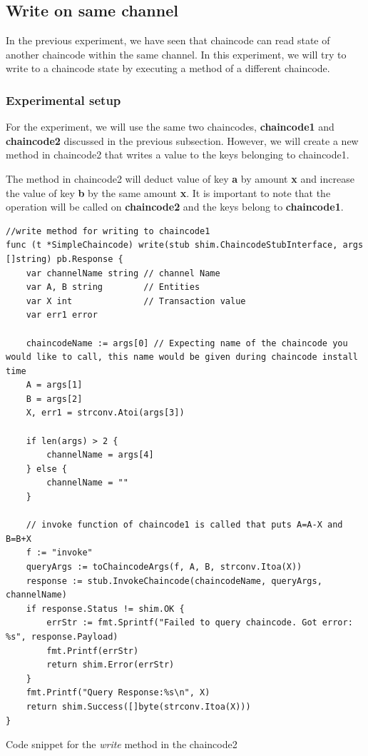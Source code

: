 \documentclass[
  a4paper,  %
  twoside,  %
  bibliography=totoc,
  headsepline,
  cleardoublepage=empty,
  parskip=half,
  draft=false
]{scrbook}
\begin{document}
\subsection{Write on same channel}
\label{ssec:wsc}
In the previous experiment, we have seen that chaincode can read state of another chaincode within the same channel. In this experiment, we will try to write to a chaincode state by executing a method of a different chaincode.

\subsubsection{Experimental setup}
For the experiment, we will use the same two chaincodes, \textbf{chaincode1} and \textbf{chaincode2} discussed in the previous subsection. However, we will create a new method in chaincode2 that writes a value to the keys belonging to chaincode1.

The method in chaincode2 will deduct value of key \textbf{a} by amount \textbf{x} and increase the value of key \textbf{b} by the same amount \textbf{x}. It is important to note that the operation will be called on \textbf{chaincode2} and the keys belong to \textbf{chaincode1}.
\begin{Listing}[h!]
\begin{lstlisting}
//write method for writing to chaincode1
func (t *SimpleChaincode) write(stub shim.ChaincodeStubInterface, args []string) pb.Response {
	var channelName string // channel Name
	var A, B string        // Entities
	var X int              // Transaction value
	var err1 error

	chaincodeName := args[0] // Expecting name of the chaincode you would like to call, this name would be given during chaincode install time
	A = args[1]
	B = args[2]
	X, err1 = strconv.Atoi(args[3])

	if len(args) > 2 {
		channelName = args[4]
	} else {
		channelName = ""
	}

	// invoke function of chaincode1 is called that puts A=A-X and B=B+X
	f := "invoke"
	queryArgs := toChaincodeArgs(f, A, B, strconv.Itoa(X))
	response := stub.InvokeChaincode(chaincodeName, queryArgs, channelName)
	if response.Status != shim.OK {
		errStr := fmt.Sprintf("Failed to query chaincode. Got error: %s", response.Payload)
		fmt.Printf(errStr)
		return shim.Error(errStr)
	}
	fmt.Printf("Query Response:%s\n", X)
	return shim.Success([]byte(strconv.Itoa(X)))
}
\end{lstlisting}
\caption{Code snippet for the \textit{write} method in the chaincode2}
\label{lst:cw}
\end{Listing}
\end{document}
